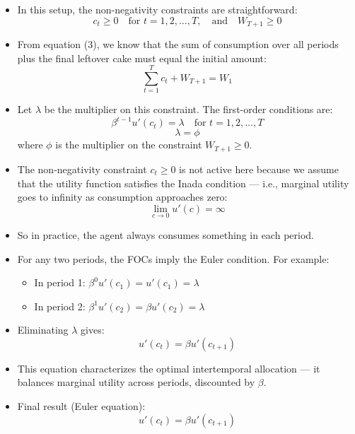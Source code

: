 \documentclass[12pt]{article}
\begin{document}
\begin{itemize}
    \item In this setup, the non-negativity constraints are straightforward:
    \[
    c_t \geq 0 \quad \text{for } t = 1, 2, \dots, T, \quad \text{and} \quad W_{T+1} \geq 0
    \]

    \item From equation (3), we know that the sum of consumption over all periods plus the final leftover cake must equal the initial amount:
    \[
    \sum_{t=1}^T c_t + W_{T+1} = W_1
    \]

    \item Let \( \lambda \) be the multiplier on this constraint. The first-order conditions are:
    \[
    \beta^{t-1} u'(c_t) = \lambda \quad \text{for } t = 1, 2, \dots, T
    \]
    \[
    \lambda = \phi
    \]
    where \( \phi \) is the multiplier on the constraint \( W_{T+1} \geq 0 \).

    \item The non-negativity constraint \( c_t \geq 0 \) is not active here because we assume that the utility function satisfies the Inada condition — i.e., marginal utility goes to infinity as consumption approaches zero:
    \[
    \lim_{c \to 0} u'(c) = \infty
    \]

    \item So in practice, the agent always consumes something in each period.

    \item For any two periods, the FOCs imply the Euler condition. For example:
    \begin{itemize}
        \item In period 1: \( \beta^{0} u'(c_1) = u'(c_1) = \lambda \)
        \item In period 2: \( \beta^{1} u'(c_2) = \beta u'(c_2) = \lambda \)
    \end{itemize}

    \item Eliminating \( \lambda \) gives:
    \[
    u'(c_t) = \beta u'(c_{t+1})
    \]

    \item This equation characterizes the optimal intertemporal allocation — it balances marginal utility across periods, discounted by \( \beta \).

    \item Final result (Euler equation):
    \[
    \boxed{u'(c_t) = \beta u'(c_{t+1})} \tag{4}
    \]
\end{itemize}
\end{document}
